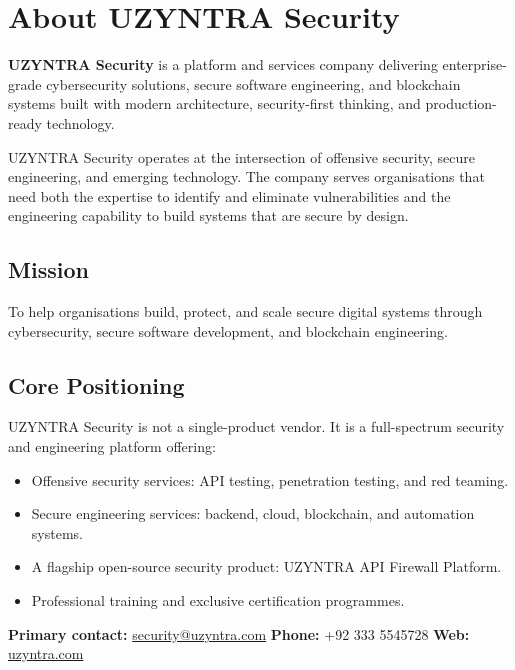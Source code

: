 \documentclass[11pt,a4paper]{article}
\begin{document}
\clearpage
\thispagestyle{fancy}
\tableofcontents
\clearpage

\section{About UZYNTRA Security}

\begin{redbar}
\textbf{UZYNTRA Security} is a platform and services company delivering enterprise-grade cybersecurity solutions, secure software engineering, and blockchain systems built with modern architecture, security-first thinking, and production-ready technology.
\end{redbar}

UZYNTRA Security operates at the intersection of offensive security, secure engineering, and emerging technology. The company serves organisations that need both the expertise to identify and eliminate vulnerabilities and the engineering capability to build systems that are secure by design.

\subsection{Mission}
To help organisations build, protect, and scale secure digital systems through cybersecurity, secure software development, and blockchain engineering.

\subsection{Core Positioning}
UZYNTRA Security is not a single-product vendor. It is a full-spectrum security and engineering platform offering:
\begin{itemize}
  \item Offensive security services: API testing, penetration testing, and red teaming.
  \item Secure engineering services: backend, cloud, blockchain, and automation systems.
  \item A flagship open-source security product: UZYNTRA API Firewall Platform.
  \item Professional training and exclusive certification programmes.
\end{itemize}

\begin{infobox}
\textbf{Primary contact:} \href{mailto:security@uzyntra.com}{security@uzyntra.com}\quad
\textbf{Phone:} +92 333 5545728\quad
\textbf{Web:} \href{https://uzyntra.com}{uzyntra.com}
\end{infobox}
\end{document}

